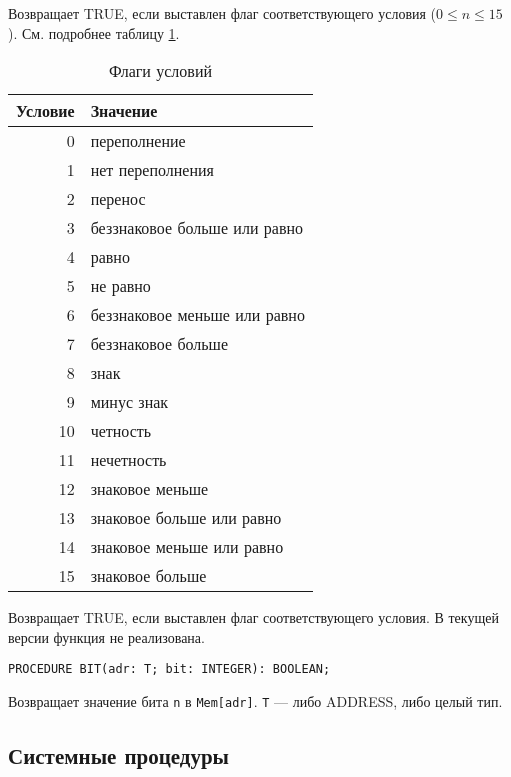 \ifcomment
Возвращает TRUE, если выставлен флаг соответствующего условия
($0\leq n\leq 15$).
См. подробнее таблицу \ref{table:cc}.
\begin{center}
\begin{table}
\begin{flushleft}
\begin{tabular}{|r|l|}\hline
\bf Условие    &\bf Значение \\ \hline
 0 &   переполнение                    \\
 1 &   нет переполнения                \\
 2 &   перенос                         \\
 3 &   беззнаковое больше или равно    \\
 4 &   равно                           \\
 5 &   не равно                        \\
 6 &   беззнаковое меньше или равно    \\
 7 &   беззнаковое больше              \\
 8 &   знак                            \\
 9 &   минус знак                      \\
10 &   четность                        \\
11 &   нечетность                      \\
12 &   знаковое меньше                 \\
13 &   знаковое больше или равно       \\
14 &   знаковое меньше или равно       \\
15 &   знаковое больше                 \\
\hline
\end{tabular}
\end{flushleft}
\caption{Флаги условий}\label{table:cc}
\end{table}
\end{center}
\else
Возвращает TRUE, если выставлен флаг соответствующего условия.
В текущей версии функция не реализована.
\fi

\begin{verbatim}
PROCEDURE BIT(adr: T; bit: INTEGER): BOOLEAN;
\end{verbatim}

Возвращает значение бита \verb|n| в \verb|Mem[adr]|.
\verb|T| --- либо ADDRESS, либо целый тип.

\subsection{Системные процедуры}

